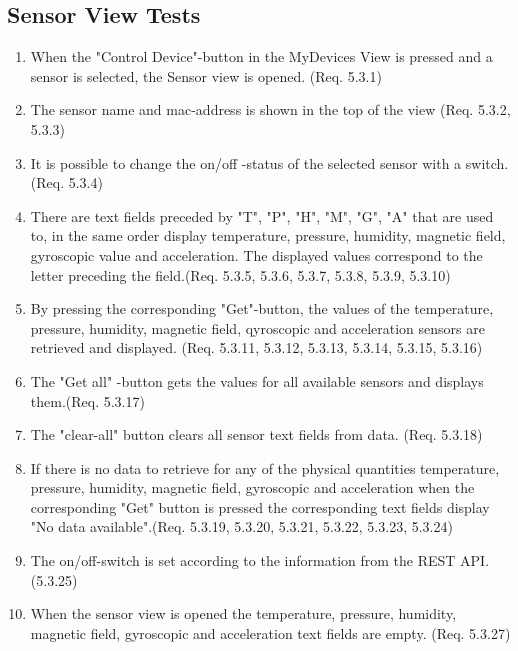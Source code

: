 \documentclass[a4paper]{article}
\newlength{\testlabellength}
\newenvironment{testlist}{\begin{enumerate}[label=\bfseries Test \thesubsection.\arabic* , labelindent=0pt, labelwidth=\testlabellength , leftmargin=2cm]}{\end{enumerate}}
\begin{document}
\begin{appendices}
\subsection{Sensor View Tests}
\begin{testlist}
\item When the "Control Device"-button in the MyDevices View is pressed and a sensor is selected, the Sensor view is opened. (Req. 5.3.1)

\item The sensor name and mac-address is shown in the top of the view (Req. 5.3.2, 5.3.3)
 
\item It is possible to change the on/off -status of the selected sensor with a switch. (Req. 5.3.4)

\item There are text fields preceded by "T", "P", "H", "M", "G", "A" that are used to, in the same order display temperature, pressure, humidity, magnetic field, gyroscopic value and acceleration. The displayed values correspond to the letter preceding the field.(Req. 5.3.5, 5.3.6, 5.3.7, 5.3.8, 5.3.9, 5.3.10)

\item By pressing the corresponding "Get"-button, the values of the temperature, pressure, humidity, magnetic field, qyroscopic and acceleration sensors are retrieved and displayed. (Req. 5.3.11, 5.3.12, 5.3.13, 5.3.14, 5.3.15, 5.3.16)
\item The "Get all" -button gets the values for all available sensors and displays them.(Req. 5.3.17)
\item The "clear-all" button clears all sensor text fields from data. (Req. 5.3.18)
\item If there is no data to retrieve for any of the physical quantities temperature, pressure, humidity, magnetic field, gyroscopic and acceleration when the corresponding "Get" button is pressed the corresponding text fields display "No data available".(Req. 5.3.19, 5.3.20, 5.3.21, 5.3.22, 5.3.23, 5.3.24)

\item The on/off-switch is set according to the information from the REST API. (5.3.25)

\item When the sensor view is opened the temperature, pressure, humidity, magnetic field, gyroscopic and acceleration text fields are empty. (Req. 5.3.27)

\end{testlist}


\end{appendices}
\end{document}
